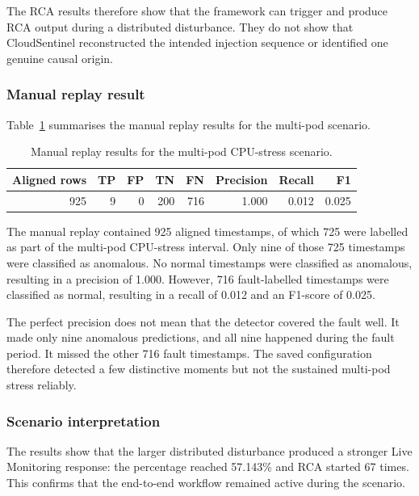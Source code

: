 The RCA results therefore show that the framework can trigger and produce RCA output during a distributed disturbance. They do not show that CloudSentinel reconstructed the intended injection sequence or identified one genuine causal origin.

\subsubsection{Manual replay result}

Table~\ref{tab:multipod-manual-detection-results} summarises the manual replay results for the multi-pod scenario.

\begin{table}[htbp]
    \centering
    \small
    \caption{Manual replay results for the multi-pod CPU-stress scenario.}
    \label{tab:multipod-manual-detection-results}
    \begin{tabular}{r r r r r r r r}
        \toprule
        \textbf{Aligned rows} & \textbf{TP} & \textbf{FP} & \textbf{TN} & \textbf{FN} & \textbf{Precision} & \textbf{Recall} & \textbf{F1} \\
        \midrule
        925 & 9 & 0 & 200 & 716 & 1.000 & 0.012 & 0.025 \\
        \bottomrule
    \end{tabular}
\end{table}

The manual replay contained 925 aligned timestamps, of which 725 were labelled as part of the multi-pod CPU-stress interval. Only nine of those 725 timestamps were classified as anomalous. No normal timestamps were classified as anomalous, resulting in a precision of 1.000. However, 716 fault-labelled timestamps were classified as normal, resulting in a recall of 0.012 and an F1-score of 0.025.

The perfect precision does not mean that the detector covered the fault well. It made only nine anomalous predictions, and all nine happened during the fault period. It missed the other 716 fault timestamps. The saved configuration therefore detected a few distinctive moments but not the sustained multi-pod stress reliably.

\subsubsection{Scenario interpretation}
The results show that the larger distributed disturbance produced a stronger Live Monitoring response: the percentage reached 57.143\% and RCA started 67 times. This confirms that the end-to-end workflow remained active during the scenario.

